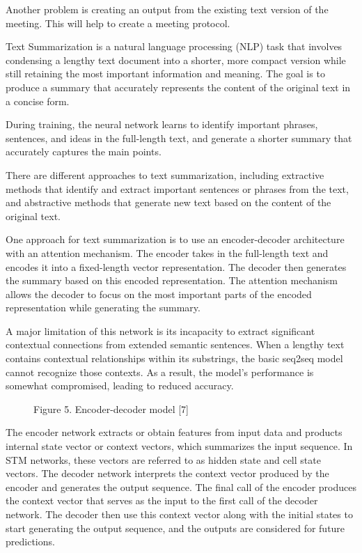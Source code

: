 \documentclass [a4paper, 10pt, twocolumn] {article}
\begin{document}
Another problem is creating an output from the existing
text version of the meeting. This will help to create a
meeting protocol.

Text Summarization is a natural language processing
(NLP) task that involves condensing a lengthy text
document into a shorter, more compact version while still retaining the most important information and meaning.
The goal is to produce a summary that accurately
represents the content of the original text in a concise
form.

During training, the neural network learns to identify
important phrases, sentences, and ideas in the full-length
text, and generate a shorter summary that accurately
captures the main points.

There are different approaches to text summarization,
including extractive methods that identify and extract important sentences or phrases from the text, and abstractive
methods that generate new text based on the content of
the original text.

One approach for text summarization is to use an
encoder-decoder architecture with an attention mechanism.
The encoder takes in the full-length text and encodes it
into a fixed-length vector representation. The decoder then
generates the summary based on this encoded representation. The attention mechanism allows the decoder to focus
on the most important parts of the encoded representation
while generating the summary.

A major limitation of this network is its incapacity to
extract significant contextual connections from extended
semantic sentences. When a lengthy text contains contextual relationships within its substrings, the basic seq2seq
model cannot recognize those contexts. As a result, the
model’s performance is somewhat compromised, leading
to reduced accuracy.
\begin{figure}[H]
	\caption*{Figure 5. Encoder-decoder model [7]}
\end{figure}

The encoder network extracts or obtain features from
input data and products internal state vector or context
vectors, which summarizes the input sequence. In STM
networks, these vectors are referred to as hidden state
and cell state vectors. The decoder network interprets the
context vector produced by the encoder and generates the
output sequence. The final call of the encoder produces
the context vector that serves as the input to the first call
of the decoder network. The decoder then use this context
vector along with the initial states to start generating the
output sequence, and the outputs are considered for future
predictions.
\end{document}
